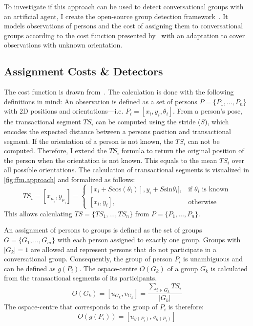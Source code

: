 To investigate if this approach can be used to detect \glspl{conversational group} with an \gls{artificial agent}, I create the open-source group detection framework~.
It models observations of persons and the cost of assigning them to \glspl{conversational group} according to the cost function presented by~ with an adaptation to cover observations with unknown orientation.

\subsection{Assignment Costs \& Detectors}\label{sec.fformation.formation.detectors}

The cost function is drawn from~.
The calculation is done with the following definitions in mind:
An observation is defined as a set of persons \(P = \{P_1,\dots,P_n\}\) with 2D positions and orientations---i.e. \(P_i = [x_i, y_i, \theta_i]\).
From a person's pose, the \gls{transactional segment} \(TS_i\) can be computed using the \gls{stride} (\(S\)), which encodes the expected distance between a persons position and \gls{transactional segment}.
If the orientation of a person is not known, the \(TS_i\) can not be computed.
Therefore, I extend the \(TS_i\) formula to return the original position of the person when the orientation is not known.
This equals to the mean \(TS_i\) over all possible orientations.
The calculation of \glspl{transactional segment} is visualized in \cref{fig:ffm.approach} and formalized as follows:
\[
    TS_i = [x_{\mu_i},y_{\mu_i}] = 
    \begin{cases}
        [x_i + S\text{cos}(\theta_i)], y_i + S \text{sin} \theta_i],& \text{if }\theta_i\text{ is known} \\
        [x_i, y_i],& \text{otherwise}
    \end{cases}
\]
This allows calculating \(TS = \{TS_1,\dots,TS_n\}\) from \(P = \{P_1,\dots,P_n\}\).

An assignment of persons to groups is defined as the set of groups \(G = \{G_1,\dots,G_m\}\) with each person assigned to exactly one group.
Groups with \(|G_k|=1\) are allowed and represent persons that do not participate in a \gls{conversational group}.
Consequently, the group of person \(P_i\) is unambiguous and can be defined as \(g(P_i)\).
The \gls{ospace}-centre \(O(G_k)\) of a group \(G_k\) is calculated from the \glspl{transactional segment} of its participants.
\[
    O(G_k) = [u_{G_k}, v_{G_k}] = \frac{\sum_{i \in G_k}{TS_i}}{|G_k|}
\]
The \gls{ospace}-centre that corresponds to the group of \(P_i\) is therefore: 
\[
    O(g(P_i)) = [u_{g(P_i)},v_{g(P_i)}]
 \]

